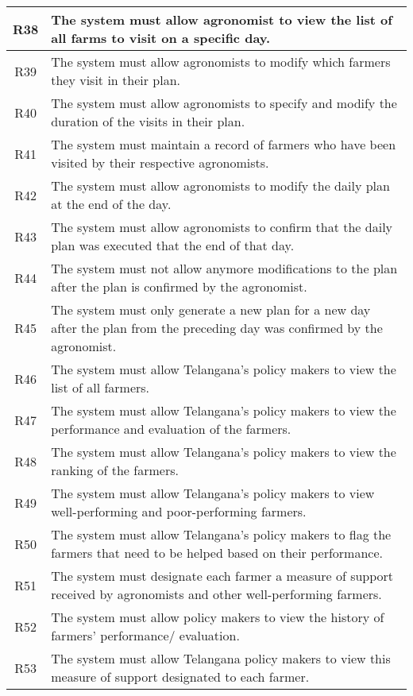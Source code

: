 \begin{center}
\begin{longtable}{|c|>{\raggedright\arraybackslash}m{15cm}|}
R38	& The system must allow agronomist to view the list of all farms to visit on a specific day.\\\hline
R39	& The system must allow agronomists to modify which farmers they visit in their plan.\\\hline
R40	& The system must allow agronomists to specify and modify the duration of the visits in their plan.\\\hline
R41	& The system must maintain a record of farmers who have been visited by their respective agronomists.\\\hline
R42	& The system must allow agronomists to modify the daily plan at the end of the day.\\\hline
R43	& The system must allow agronomists to confirm that the daily plan was executed that the end of that day.\\\hline
R44	& The system must not allow anymore modifications to the plan after the plan is confirmed by the agronomist.\\\hline
R45	& The system must only generate a new plan for a new day after the plan from the preceding day was confirmed by the agronomist.\\\hline
R46	& The system must allow Telangana’s policy makers to view the list of all farmers.\\\hline
R47	& The system must allow Telangana’s policy makers to view the performance and evaluation of the farmers.\\\hline
R48	& The system must allow Telangana’s policy makers to view the ranking of the farmers.\\\hline
R49	& The system must allow Telangana’s policy makers to view well-performing and poor-performing farmers.\\\hline
R50	& The system must allow Telangana’s policy makers to flag the farmers that need to be helped based on their performance.\\\hline
R51	& The system must designate each farmer a measure of support received by agronomists and other well-performing farmers.\\\hline
R52	& The system must allow policy makers to view the history of farmers’ performance/ evaluation.\\\hline
R53	& The system must allow Telangana policy makers to view this measure of support designated to each farmer.\\\hline
\end{longtable}
\end{center}